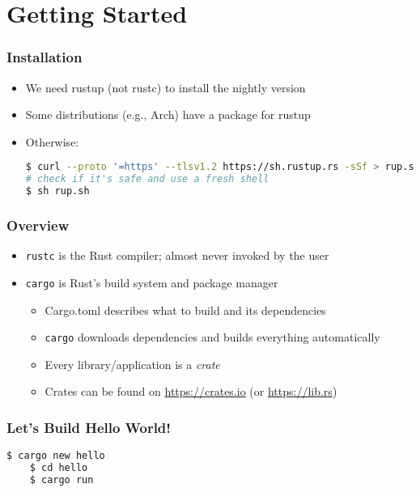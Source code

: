 \section{Getting Started}

\begin{frame}[fragile]
    \frametitle{Installation}

    \begin{itemize}
        \item We need rustup (not rustc) to install the nightly version
        \item Some distributions (e.g., Arch) have a package for rustup
        \item Otherwise:
\begin{lstlisting}[language=bash]
$ curl --proto '=https' --tlsv1.2 https://sh.rustup.rs -sSf > rup.sh
# check if it's safe and use a fresh shell
$ sh rup.sh
\end{lstlisting}
    \end{itemize}
\end{frame}

\begin{frame}
    \frametitle{Overview}

    \begin{itemize}
        \item \texttt{rustc} is the Rust compiler; almost never invoked by the user
        \item \texttt{cargo} is Rust's build system and package manager
        \begin{itemize}
            \item Cargo.toml describes what to build and its dependencies
            \item \texttt{cargo} downloads dependencies and builds everything automatically
            \item Every library/application is a \emph{crate}
            \item Crates can be found on \url{https://crates.io} (or \url{https://lib.rs})
        \end{itemize}
    \end{itemize}
\end{frame}

\begin{frame}[fragile]
    \frametitle{Let's Build Hello World!}

    \begin{lstlisting}[language=bash]
    $ cargo new hello
    $ cd hello
    $ cargo run
    \end{lstlisting}
\end{frame}
